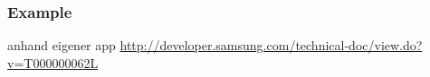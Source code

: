 \subsubsection{Example} \label{subsection:license-samsung-example}
anhand eigener app\newline
\url{http://developer.samsung.com/technical-doc/view.do?v=T000000062L}
